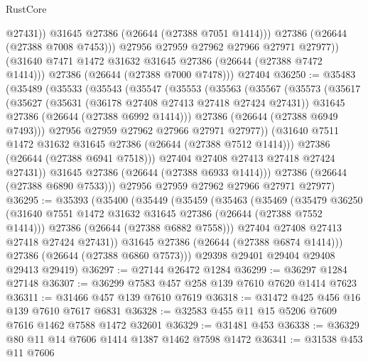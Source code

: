 \begin{lexlean}{RustCore}
\begin{coremodule}
                  @27431))
              @31645
              @27386
              (@26644 (@27388 @7051 @1414)))
            @27386
            (@26644 (@27388 @7008 @7453)))
          @27956
          @27959
          @27962
          @27966
          @27971
          @27977))
      (@31640 @7471 @1472 @31632 @31645 @27386 (@26644 (@27388 @7472 @1414)))
      @27386
      (@26644 (@27388 @7000 @7478)))
    @27404
@36250 := @35483
    (@35489
      (@35533
        (@35543
          (@35547
            (@35553
              (@35563
                (@35567
                  (@35573
                    (@35617
                      (@35627
                        (@35631 (@36178 @27408 @27413 @27418 @27424 @27431))
                        @31645
                        @27386
                        (@26644 (@27388 @6992 @1414)))
                      @27386
                      (@26644 (@27388 @6949 @7493)))
                    @27956
                    @27959
                    @27962
                    @27966
                    @27971
                    @27977))
                (@31640 @7511 @1472 @31632 @31645 @27386 (@26644 (@27388 @7512 @1414)))
                @27386
                (@26644 (@27388 @6941 @7518)))
              @27404
              @27408
              @27413
              @27418
              @27424
              @27431))
          @31645
          @27386
          (@26644 (@27388 @6933 @1414)))
        @27386
        (@26644 (@27388 @6890 @7533)))
      @27956
      @27959
      @27962
      @27966
      @27971
      @27977)
@36295 := @35393
    (@35400
      (@35449
        (@35459
          (@35463
            (@35469
              (@35479
                @36250
                (@31640 @7551 @1472 @31632 @31645 @27386 (@26644 (@27388 @7552 @1414)))
                @27386
                (@26644 (@27388 @6882 @7558)))
              @27404
              @27408
              @27413
              @27418
              @27424
              @27431))
          @31645
          @27386
          (@26644 (@27388 @6874 @1414)))
        @27386
        (@26644 (@27388 @6860 @7573)))
      @29398
      @29401
      @29404
      @29408
      @29413
      @29419)
@36297 := @27144 @26472 @1284
@36299 := @36297 @1284 @27148
@36307 := @36299 @7583 @457 @258 @139 @7610 @7620 @1414 @7623
@36311 := @31466 @457 @139 @7610 @7619
@36318 := @31472 @425 @456 @16 @139 @7610 @7617 @6831
@36328 := @32583 @455 @11 @15 @5206 @7609 @7616 @1462 @7588 @1472 @32601
@36329 := @31481 @453
@36338 := @36329 @80 @11 @14 @7606 @1414 @1387 @1462 @7598 @1472
@36341 := @31538 @453 @11 @7606

\end{coremodule}
\end{lexlean}
